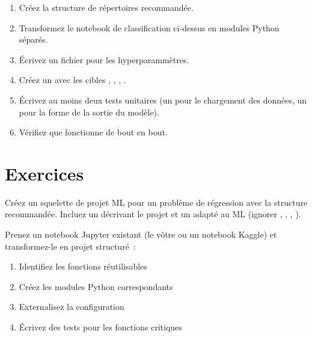 \begin{miniprojet}[title=\textbf{Mini-projet 1~: Du notebook au projet structur\'e}]
\begin{enumerate}
  \item Cr\'eez la structure de r\'epertoires recommand\'ee.
  \item Transformez le notebook de classification ci-dessus en modules
    Python s\'epar\'es.
  \item \'Ecrivez un fichier  pour les hyperparamm\`etres.
  \item Cr\'eez un  avec les cibles ,
    , , .
  \item \'Ecrivez au moins deux tests unitaires (un pour le chargement des
    donn\'ees, un pour la forme de la sortie du mod\`ele).
  \item V\'erifiez que  fonctionne de bout en bout.
\end{enumerate}
\end{miniprojet}

\section{Exercices}
\label{sec:exercises-ch1}

\begin{exercice}
Cr\'eez un squelette de projet ML pour un probl\`eme de r\'egression avec
la structure recommand\'ee. Incluez un  d\'ecrivant le
projet et un  adapt\'e au ML (ignorer ,
, , ).
\end{exercice}

\begin{exercice}
Prenez un notebook Jupyter existant (le v\^otre ou un notebook Kaggle) et
transformez-le en projet structur\'e~:
\begin{enumerate}
  \item Identifiez les fonctions r\'eutilisables
  \item Cr\'eez les modules Python correspondants
  \item Externalisez la configuration
  \item \'Ecrivez des tests pour les fonctions critiques
\end{enumerate}
\end{exercice}

